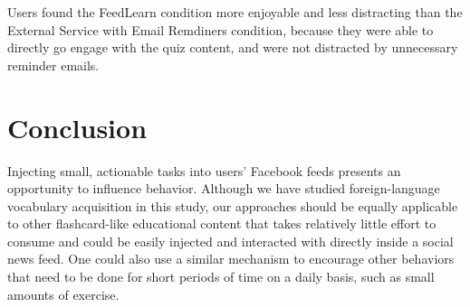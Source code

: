 \documentclass{chi-ext}
\begin{document}
Users found the FeedLearn condition more enjoyable and less distracting than the External Service with Email Remdiners condition, because they were able to directly go engage with the quiz content, and were not distracted by unnecessary reminder emails.

\section{Conclusion}

Injecting small, actionable tasks into users' Facebook feeds presents an opportunity to influence behavior. Although we have studied foreign-language vocabulary acquisition in this study, our approaches should be equally applicable to other flashcard-like educational content that takes relatively little effort to consume and could be easily injected and interacted with directly inside a social news feed. One could also use a similar mechanism to encourage other behaviors that need to be done for short periods of time on a daily basis, such as small amounts of exercise.



\end{document}
